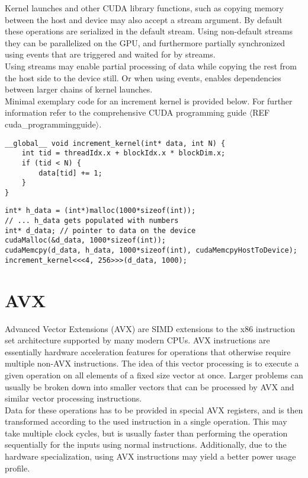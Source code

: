 \documentclass{tudscrreprt}
\newcommand{\markr}[1]{\textcolor{review}{$\langle$#1$\rangle$}}
\begin{document}
				Kernel launches and other CUDA library functions, such as copying memory between the host and device may also accept a stream argument. By default these operations are serialized in the default stream. Using non-default streams they can be parallelized on the GPU, and furthermore partially synchronized using events that are triggered and waited for by streams. \\
				Using streams may enable partial processing of data while copying the rest from the host side to the device still. Or when using events, enables dependencies between larger chains of kernel launches. \\
				
				Minimal exemplary code for an increment kernel is provided below. For further information refer to the comprehensive CUDA programming guide \markr{REF cuda\_programmingguide}.
				\begin{lstlisting}[caption=Device Side: Increment Kernel]
__global__ void increment_kernel(int* data, int N) {
	int tid = threadIdx.x + blockIdx.x * blockDim.x;
	if (tid < N) {
		data[tid] += 1;
	}
}
				\end{lstlisting}
				
				\begin{lstlisting}[caption=Host Side: Device Malloc and Kernel Launch]
int* h_data = (int*)malloc(1000*sizeof(int));
// ... h_data gets populated with numbers
int* d_data; // pointer to data on the device
cudaMalloc(&d_data, 1000*sizeof(int));
cudaMemcpy(d_data, h_data, 1000*sizeof(int), cudaMemcpyHostToDevice);
increment_kernel<<<4, 256>>>(d_data, 1000);
				\end{lstlisting}
				
			
		\section{AVX}
			Advanced Vector Extensions (AVX) are SIMD extensions to the x86 instruction set architecture supported by many modern CPUs. AVX instructions are essentially hardware acceleration features for operations that otherwise require multiple non-AVX instructions. The idea of this vector processing is to execute a given operation on all elements of a fixed size vector at once. Larger problems can usually be broken down into smaller vectors that can be processed by AVX and similar vector processing instructions. \\
			Data for these operations has to be provided in special AVX registers, and is then transformed according to the used instruction in a single operation. This may take multiple clock cycles, but is usually faster than performing the operation sequentially for the inputs using normal instructions. Additionally, due to the hardware specialization, using AVX instructions may yield a better power usage profile. \\
			
\end{document}
